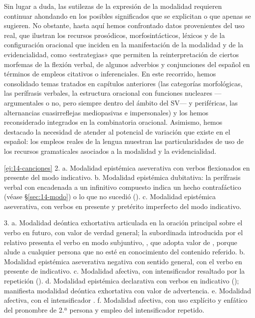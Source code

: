 \begin{recuadro}
Sin lugar a duda, las sutilezas de la expresión de la modalidad requieren
continuar ahondando en los posibles significados que se explicitan o que apenas
se sugieren. No obstante, hasta aquí hemos confrontado datos provenientes del
uso real, que ilustran los recursos prosódicos, morfosintácticos, léxicos y de
la configuración oracional que inciden en la manifestación de la modalidad y de
la evidencialidad, como «estrategias» que permiten la reinterpretación de
ciertos morfemas de la flexión verbal, de algunos adverbios y conjunciones del
español en términos de empleos citativos o inferenciales. En este recorrido,
hemos consolidado temas tratados en capítulos anteriores (las categorías
morfológicas, las perífrasis verbales, la estructura oracional con funciones
nucleares ---argumentales o no, pero siempre dentro del ámbito del SV--- y
periféricas, las alternancias cuasirreflejas mediopasivas e impersonales) y los
hemos reconsiderado integrados en la combinatoria oracional. Asimismo, hemos
destacado la necesidad de atender al potencial de variación que existe en el
español: los empleos reales de la lengua muestran las particularidades de uso de
los recursos gramaticales asociados a la modalidad y la evidencialidad.
\end{recuadro}

\lecturasrecomendadas

\solucionario

\begin{solucion}{\ref{ej:14-canciones}}
2. a. Modalidad epistémica aseverativa con verbos flexionados en presente del
modo indicativo. b. Modalidad epistémica dubitativa: la perífrasis verbal con
 encadenada a un infinitivo compuesto indica un hecho contrafáctico
(véase §\ref{sec:14-modo}) o lo que no sucedió (). c. Modalidad epistémica aseverativa, con verbos en presente y
pretérito imperfecto del modo indicativo.

3. a. Modalidad deóntica exhortativa articulada en la oración principal sobre el
verbo  en futuro, con valor de verdad general; la subordinada
introducida por el relativo  presenta el verbo en modo subjuntivo,
, que adopta valor de , porque alude a
cualquier persona que no esté en conocimiento del contenido referido. b.
Modalidad epistémica aseverativa negativa con sentido general, con el verbo en
presente de indicativo. c. Modalidad afectiva, con intensificador resaltado por
la repetición (). d. Modalidad epistémica declarativa con
verbos en indicativo ();  manifiesta modalidad
deóntica exhortativa con valor de advertencia. e. Modalidad afectiva, con el
intensificador . f. Modalidad afectiva, con uso explícito y
enfático del pronombre de 2.ª persona y empleo del intensificador 
repetido.
\end{solucion}

